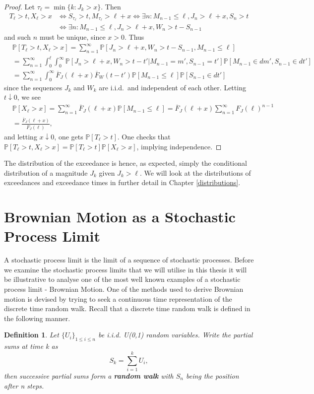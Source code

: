 \documentclass[honours,12pt,twoside, openright]{unswthesis}
\newcommand{\pr}{\mathbb {P}}
\newcommand{\1}{\mathbf 1}
\newtheorem{definition}[equation]{Definition}
\numberwithin{equation}{section}
\theoremstyle{definition}
\theoremstyle{remark}
\begin{document}
\begin{proof}
Let $\tau_\ell = \min\{k: J_k > x\}$. Then
\begin{align*}
T_\ell > t, X_\ell > x 
&\Longleftrightarrow
S_{\tau_\ell} > t, M_{\tau_\ell} > \ell + x
\Longleftrightarrow
\exists n: M_{n-1} \le \ell, J_n > \ell + x, S_n > t
\\
&\Longleftrightarrow
\exists n: M_{n-1} \le \ell, J_n > \ell + x, W_n > t - S_{n-1}
\end{align*}
and such $n$ must be unique, since $x > 0$.
Thus 
\begin{align*}
&\pr[T_\ell > t, X_\ell > x]
= \sum_{n=1}^\infty \pr[J_n > \ell + x, W_n > t - S_{n-1}, M_{n-1} \le \ell]
\\
&= \sum_{n=1}^\infty \int_0^\ell \int_0^\infty \pr[J_n > \ell + x, W_n > t - t' | M_{n-1} = m', 
S_{n-1} = t'] \pr[M_{n-1} \in dm', S_{n-1} \in dt']
\\
&= \sum_{n=1}^\infty \int_0^\infty \overline F_J(\ell + x) \overline F_W(t - t')
\pr[M_{n-1} \le \ell] \pr[S_{n-1} \in dt']
\end{align*}
since the sequences $J_k$ and $W_k$ are i.i.d.\ and independent of each other.
Letting $t \downarrow 0$, we see
\begin{align*}
&\pr[X_\ell > x] 
= \sum_{n=1}^\infty \overline F_J(\ell+x) \pr[M_{n-1} \le \ell] 
= \overline F_J(\ell+x) \sum_{n=1}^\infty F_J(\ell)^{n-1}
\\
&= \frac{\overline F_J(\ell + x)}{\overline F_J(\ell)},
\end{align*}
and letting $x \downarrow 0$, one gets $\pr[T_\ell > t]$. 
One checks that $\pr[T_\ell > t, X_\ell > x] = \pr[T_\ell > t] \pr[X_\ell > x]$, implying independence.
\end{proof}
\noindent The distribution of the exceedance is hence, as expected, simply the
conditional distribution of a magnitude $J_k$ given $J_k > \ell$. We will look at the distributions of exceedances and exceedance times in further detail in Chapter \ref{distributions}.

\section{Brownian Motion as a Stochastic Process Limit}\label{s:background}
A stochastic process limit is the limit of a sequence of stochastic processes. Before we examine the stochastic process limits that we will utilise in this thesis it will be illustrative to analyse one of the most well known examples of a stochastic process limit - Brownian Motion. One of the methods used to derive Brownian motion is devised by trying to seek a continuous time representation of the discrete time random walk. Recall that a discrete time random walk is defined in the following manner.\\
\begin{definition}
Let $\{U_i\}_{1\leq i \leq n}$ be i.i.d. U(0,1) random variables. Write the partial sums at time k as
\[
	S_k=\sum_{i=1}^k U_i,
\]
then successive partial sums form a \textbf{random walk} with $S_n$ being the position after n steps.
\\
\end{definition}
\end{document}
